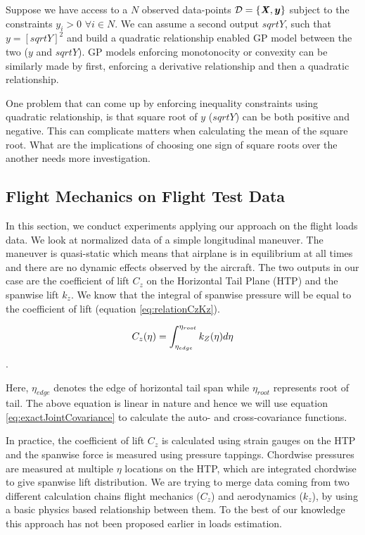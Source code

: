 Suppose we have access to a $N$ observed data-points $\mathcal{D} = \{\bm{\mathit{X}}, \boldsymbol{y}\}$ subject to the constraints $y_i > 0$ $\forall i \in N$. We can assume a second output $sqrtY$, such that $y = \left [sqrtY \right]^2$ and build a quadratic relationship enabled GP model between the two ($y$ and $sqrtY$). GP models enforcing monotonocity or convexity can be similarly made by first, enforcing a derivative relationship and then a quadratic relationship. 

One problem that can come up by enforcing inequality constraints using quadratic relationship, is that square root of $y$ ($sqrtY$) can be both positive and negative. This can complicate matters when calculating the mean of the square root. What are the implications of choosing one sign of square roots over the another needs more investigation. 

\subsection{Flight Mechanics on Flight Test Data}\label{sub:experimentsFlightLoadsData}
In this section, we conduct experiments applying our approach on the flight loads data. We look at normalized data of a simple longitudinal maneuver. The maneuver is quasi-static which means that airplane is in equilibrium at all times and there are no dynamic effects observed by the aircraft. The two outputs in our case are the coefficient of lift \(C_{z}\) on the Horizontal Tail Plane (HTP) and the spanwise lift \(k_{z}\). We know that the integral of spanwise pressure will be equal to the coefficient of lift (equation \ref{eq:relationCzKz}).

\begin{equation}\label{eq:relationCzKz}
\centering
C_{z}(\eta) = \int_{\eta_{edge}}^{\eta_{root}} k_{Z}(\eta)d\eta
\end{equation}.

Here, \(\eta_{edge}\) denotes the edge of horizontal tail span while \(\eta_{root}\) represents root of tail. The above equation is linear in nature and hence we will use equation \ref{eq:exactJointCovariance} to calculate the auto- and cross-covariance functions.

In practice, the coefficient of lift \(C_{z}\) is calculated using strain gauges on the HTP and the spanwise force is measured using pressure tappings. Chordwise pressures are measured at multiple \(\eta\) locations on the HTP, which are integrated chordwise to give spanwise lift distribution. We are trying to merge data coming from two different calculation chains flight mechanics (\(C_{z}\)) and aerodynamics (\(k_{z}\)), by using a basic physics based relationship between them. To the best of our knowledge this approach has not been proposed earlier in loads estimation.


